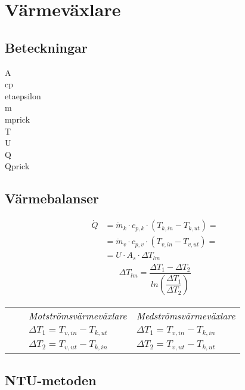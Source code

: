 \chapter{Värmeväxlare}
\section*{Beteckningar}

\acrfull{A} \\
\acrfull{cp} \\
\acrfull{etaepsilon} \\
\acrfull{m} \\
\acrfull{mprick} \\
\acrfull{T} \\
\acrfull{U} \\
\acrfull{Q} \\
\acrfull{Qprick}

\section*{Värmebalanser}
	\begin{align*}
		\dot{Q}&=\dot{m}_k\cdot c_{p,k}\cdot (T_{k,in}-T_{k,ut}) = \\
		       &=\dot{m}_v\cdot c_{p,v}\cdot (T_{v,in}-T_{v,ut}) = \\
		       &=U \cdot A_s \cdot \Delta T_{lm} 
	\end{align*}
	\begin{align*}
	\Delta T_{lm} = \dfrac{\Delta T_1 - \Delta T_2}{ln \left( \dfrac{\Delta T_1}{\Delta T_2}\right)}
	\end{align*}
	\begin{tabular}{l l l l}
    &&\textit{Motströmsvärmeväxlare} & \textit{Medströmsvärmeväxlare} \\
    &&$\Delta T_1 = T_{v,in} - T_{k,ut}$ & $\Delta T_1 = T_{v,in} - T_{k,in}$ \\
    &&$\Delta T_2 = T_{v,ut} - T_{k,in}$ & $\Delta T_2 = T_{v,ut} - T_{k,ut}$ \\
	\end{tabular}
	\section*{NTU-metoden}
